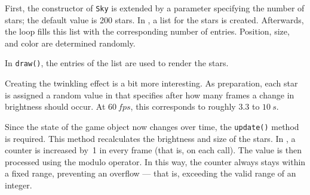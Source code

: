 First, the constructor of \texttt{Sky} is extended by a parameter specifying the number of stars; the default value is 200 stars. In , a list for the stars is created. Afterwards, the loop fills this list with the corresponding number of entries. Position, size, and color are determined randomly.


In \texttt{draw()}, the entries of the list are used to render the stars.



Creating the twinkling effect is a bit more interesting. As preparation, each star is assigned a random value in  that specifies after how many frames a change in brightness should occur. At $\SI{60}{fps}$, this corresponds to roughly $3.3$ to $\SI{10}{s}$.


\begin{figure}%
	\begin{center}%
		\vspace{-6ex}%
	\end{center}%
\end{figure}%
Since the state of the game object now changes over time, the \texttt{update()} method is required. This method recalculates the brightness and size of the stars. In , a counter is increased by~1 in every frame (that is, on each call). The value is then processed using the modulo operator. In this way, the counter always stays within a fixed range, preventing an overflow — that is, exceeding the valid range of an integer.


